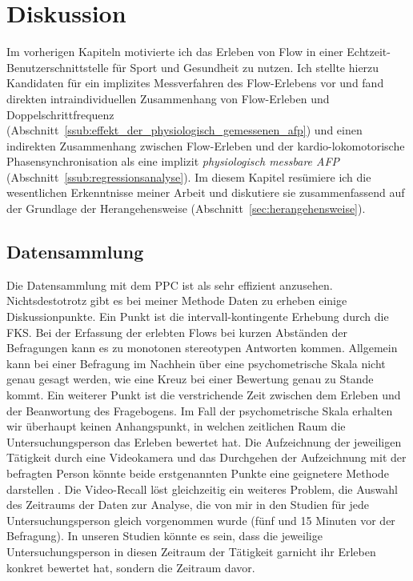 

\chapter{Diskussion} \label{cha:diskussion} 
Im vorherigen Kapiteln motivierte ich das Erleben von Flow in einer Echtzeit-Benutzerschnittstelle für Sport und Gesundheit zu nutzen. Ich stellte hierzu Kandidaten für ein implizites Messverfahren des Flow-Erlebens vor und fand direkten intraindividuellen Zusammenhang von Flow-Erleben und Doppelschrittfrequenz (Abschnitt~\ref{ssub:effekt_der_physiologisch_gemessenen_afp}) und einen indirekten Zusammenhang zwischen Flow-Erleben und der kardio-lokomotorische Phasensynchronisation als eine implizit \emph{physiologisch messbare \ac{AFP}} (Abschnitt~\ref{ssub:regressionsanalyse}). Im diesem Kapitel resümiere ich die wesentlichen Erkenntnisse meiner Arbeit und diskutiere sie zusammenfassend auf der Grundlage der Herangehensweise (Abschnitt~\ref{sec:herangehensweise}). 

\section{Datensammlung} %
\label{sec:datensammlung}

Die Datensammlung mit dem \ac{PPC} ist als sehr effizient anzusehen. Nichtsdestotrotz gibt es bei meiner Methode Daten zu erheben einige Diskussionpunkte. Ein Punkt ist die intervall-kontingente Erhebung durch die \ac{FKS}. Bei der Erfassung der erlebten Flows bei kurzen Abständen der Befragungen kann es zu monotonen stereotypen Antworten kommen. Allgemein kann bei einer Befragung im Nachhein über eine psychometrische Skala nicht genau gesagt werden, wie eine Kreuz bei einer Bewertung genau zu Stande kommt. Ein weiterer Punkt ist die verstrichende Zeit zwischen dem Erleben und der Beanwortung des Fragebogens. Im Fall der psychometrische Skala erhalten wir überhaupt keinen Anhangspunkt, in welchen zeitlichen Raum die Untersuchungsperson das Erleben bewertet hat. Die Aufzeichnung der jeweiligen Tätigkeit durch eine Videokamera und das Durchgehen der Aufzeichnung mit der befragten Person könnte beide erstgenannten Punkte eine geignetere Methode darstellen \citep[Video-Recall][S.~566]{Leuchter2006}.
Die Video-Recall löst gleichzeitig ein weiteres Problem, die Auswahl des Zeitraums der Daten zur Analyse, die von mir in den Studien für jede Untersuchungsperson gleich vorgenommen wurde (fünf und 15 Minuten vor der Befragung). In unseren Studien könnte es sein, dass die jeweilige Untersuchungsperson in diesen Zeitraum der Tätigkeit garnicht ihr Erleben konkret bewertet hat, sondern die Zeitraum davor.  

